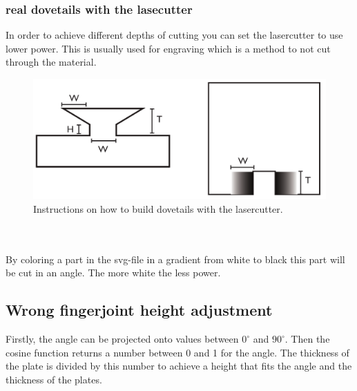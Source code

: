 \documentclass[../ClassicThesis.tex]{subfiles}
\begin{document}
\subsubsection{real dovetails with the lasecutter}
In order to achieve different depths of cutting you can set the lasercutter to use lower power. This is usually used for engraving which is a method to not cut through the material.
\begin{figure}[!ht]
    \centering
    \includegraphics[width=0.5\columnwidth]{Images/06-2-joints-schwalbeMitLaser.png}
    \caption{Instructions on how to build dovetails with the lasercutter.}
    \end{figure}
\\
\\
By coloring a part in the svg-file in a gradient from white to black this part will be cut in an angle. The more white the less power.

\subsection{Wrong fingerjoint height adjustment}
Firstly, the angle can be projected onto values between $0^\circ$ and $90^\circ$. Then the cosine function returns a number between 0 and 1 for the angle. The thickness of the plate is divided by this number to achieve a height that fits the angle and the thickness of the plates. 
\end{document}

